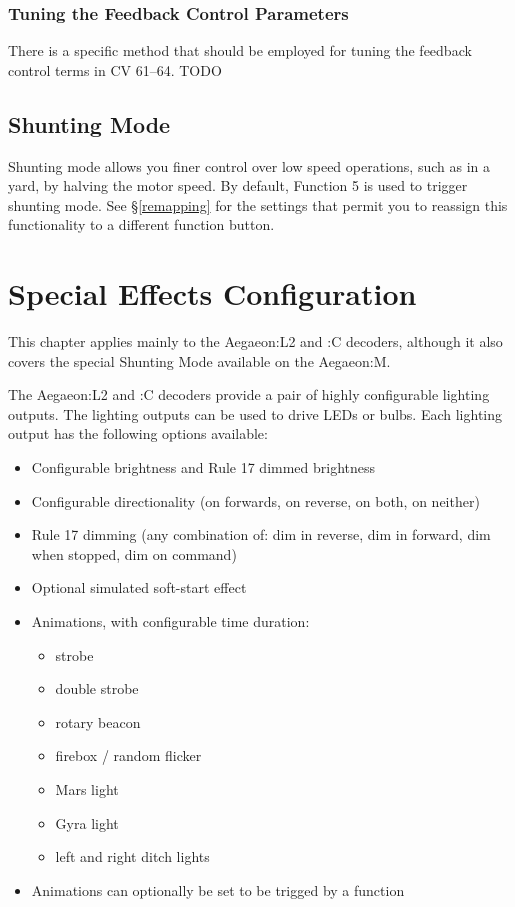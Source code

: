 \documentclass[12pt,letterpaper,draft]{memoir} %
\begin{document}
\subsection{Tuning the Feedback Control Parameters}

There is a specific method that should be employed for tuning the feedback control terms in CV 61--64. TODO

\section{Shunting Mode}
\label{ShuntingMode}

Shunting mode allows you finer control over low speed operations, such as in a yard, by halving the motor speed. By default, Function 5 is used to trigger shunting mode. See \S\ref{remapping} for the settings that permit you to reassign this functionality to a different function button.


\chapter{Special Effects Configuration}
\label{specialeffectsconfiguration}
This chapter applies mainly to the Aegaeon:L2 and :C decoders, although it also covers the special Shunting Mode available on the Aegaeon:M.

The Aegaeon:L2 and :C decoders provide a pair of highly configurable lighting outputs. The lighting outputs can be used to drive LEDs or bulbs. Each lighting output has the following options available:
\begin{itemize}
\item Configurable brightness and Rule 17 dimmed brightness
\item Configurable directionality (on forwards, on reverse, on both, on neither)
\item Rule 17 dimming (any combination of: dim in reverse, dim in forward, dim when stopped, dim on command)
\item Optional simulated soft-start effect
\item Animations, with configurable time duration:
\begin{itemize}
\item strobe
\item double strobe
\item rotary beacon
\item firebox / random flicker
\item Mars light
\item Gyra light
\item left and right ditch lights
\end{itemize}
\item Animations can optionally be set to be trigged by a function
\end{itemize}
\end{document}
